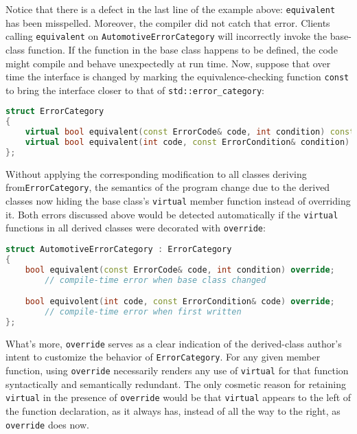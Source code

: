 \noindent Notice that there is a defect in the last line of the example above:
\lstinline!equivalent! has been misspelled. Moreover, the compiler did not
catch that error. Clients calling \lstinline!equivalent! on
\lstinline!AutomotiveErrorCategory! will incorrectly invoke the base-class
function. If the function in the base class happens to be defined, the
code might compile and behave unexpectedly at run time. Now, suppose
that over time the interface is changed by marking the
equivalence-checking function \lstinline!const! to bring the interface
closer to that of \lstinline!std::error_category!:

\begin{lstlisting}[language=C++]
struct ErrorCategory
{
    virtual bool equivalent(const ErrorCode& code, int condition) const;
    virtual bool equivalent(int code, const ErrorCondition& condition) const;
};
\end{lstlisting}
    
Without applying the corresponding modification to all classes deriving
from\linebreak[4] \lstinline!ErrorCategory!, the semantics of the program change due to
the derived classes now hiding 
the base class's
\lstinline!virtual! member function instead of overriding it. Both errors discussed above
would be detected automatically if the \lstinline!virtual!
functions in all derived classes were decorated with \lstinline!override!:

\begin{lstlisting}[language=C++]
struct AutomotiveErrorCategory : ErrorCategory
{
    bool equivalent(const ErrorCode& code, int condition) override;
        // compile-time error when base class changed

    bool equivolent(int code, const ErrorCondition& code) override;
        // compile-time error when first written
};
\end{lstlisting}
    
\noindent What's more, \lstinline!override! serves as a clear indication of the derived-class author's intent to customize the
behavior of \lstinline!ErrorCategory!. For any given member function, using \lstinline!override! necessarily renders any use of \lstinline!virtual! for
that function syntactically and semantically redundant. The only
cosmetic reason for retaining \lstinline!virtual! in the presence of
\lstinline!override! would be that \lstinline!virtual! appears to the left of
the function declaration, as it always has, instead of all the way to
the right, as \lstinline!override! does now.


